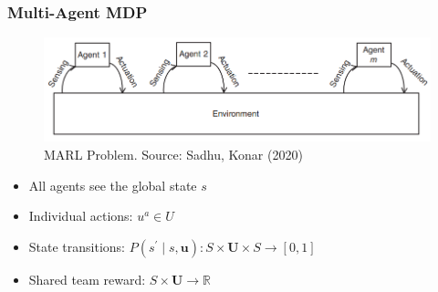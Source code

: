 \documentclass{beamer}
\begin{document}


    \begin{frame}
        \frametitle{Multi-Agent MDP}

        \begin{figure}
            \includegraphics[scale=0.65]{1a_marl}
            \caption{MARL Problem. Source: Sadhu, Konar (2020)}
        \end{figure}

        \begin{itemize}
            \item All agents see the global state $s$
            \item Individual actions: $u^{a} \in U$
            \item State transitions: $P\left(s^{\prime} \mid s, \mathbf{u}\right): S \times \mathbf{U} \times S \rightarrow[0,1]$
            \item Shared team reward: $S \times \mathbf{U} \rightarrow \mathbb{R}$ 
            
            
        \end{itemize}

    \end{frame}


\end{document}
